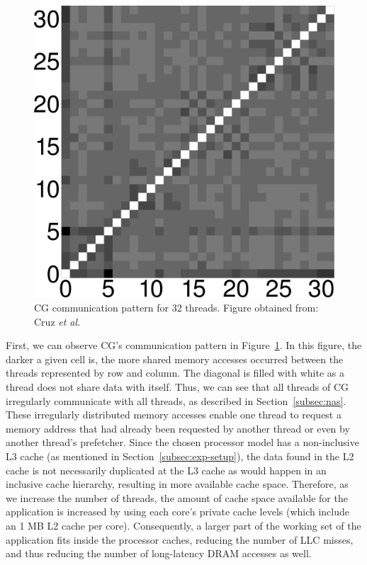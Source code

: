 \documentclass[AMA,final,STIX1COL]{WileyNJD-v2}
\begin{document}
\begin{figure}[!htb]
    \centering
    \includegraphics[width=.3\linewidth]{figures/cg.pdf}
    \caption{CG communication pattern for 32 threads. Figure obtained from: Cruz \textit{et al.}~\cite{cruz2018thread}}
    \label{fig:figcomma}
\end{figure}



First, we can observe CG's communication pattern in Figure~\ref{fig:figcomma}.
In this figure, the darker a given cell is, the more shared memory accesses occurred between the threads represented by row and column.
The diagonal is filled with white as a thread does not share data with itself.
Thus, we can see that all threads of CG irregularly communicate with all threads, as described in Section~\ref{subsec:nas}.
These irregularly distributed memory accesses enable one thread to request a memory address that had already been requested by another thread or even by another thread's prefetcher.
Since the chosen processor model has a non-inclusive L3 cache (as mentioned in Section~\ref{subsec:exp-setup}), the data found in the L2 cache is not necessarily duplicated at the L3 cache as would happen in an inclusive cache hierarchy, resulting in more available cache space.
Therefore, as we increase the number of threads, the amount of cache space available for the application is increased by using each core's private cache levels (which include an 1 MB L2 cache per core).
Consequently, a larger part of the working set of the application fits inside the processor caches, reducing the number of LLC misses, and thus reducing the number of long-latency DRAM accesses as well. 
\end{document}
